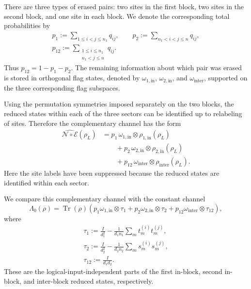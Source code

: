 \documentclass[10pt,twocolumn,superscriptaddress,aps,amsmath,amssymb,citeautoscript,floatfix,prx,longbibliography]{revtex4-2}
\theoremstyle{plain}
\theoremstyle{plain}
\theoremstyle{plain}
\theoremstyle{plain}
\theoremstyle{plain}
\theoremstyle{plain}
\begin{document}
There are three types of erased pairs: two sites in the first block, two sites in the second block, and one site in each block. We denote the corresponding total probabilities by
$$
\begin{gathered}
    p_1
    :=
    \sum_{1\le i<j\le n_1}
    q_{ij},
    \qquad
    p_2
    :=
    \sum_{n_1<i<j\le n}
    q_{ij},
    \\
    p_{12}
    :=
    \sum_{\substack{1\le i\le n_1\\ n_1<j\le n}}
    q_{ij}.
\end{gathered}
$$
Thus $p_{12}=1-p_1-p_2$. The remaining information about which pair was erased is stored in orthogonal flag states, denoted by $\omega_{1,\mathrm{in}}$, $\omega_{2,\mathrm{in}}$, and $\omega_{\mathrm{inter}}$, supported on the three corresponding flag subspaces.

Using the permutation symmetries imposed separately on the two blocks, the reduced states within each of the three sectors can be identified up to relabeling of sites. Therefore the complementary channel has the form
$$
\begin{aligned}
    \widehat{\mathcal N\circ\mathcal E}(\rho_L)
    &=
    p_1\,
    \omega_{1,\mathrm{in}}
    \otimes
    \rho_{1,\mathrm{in}}(\rho_L)
    \\
    &\qquad
    +
    p_2\,
    \omega_{2,\mathrm{in}}
    \otimes
    \rho_{2,\mathrm{in}}(\rho_L)
    \\
    &\qquad
    +
    p_{12}\,
    \omega_{\mathrm{inter}}
    \otimes
    \rho_{\mathrm{inter}}(\rho_L).
\end{aligned}
$$
Here the site labels have been suppressed because the reduced states are identified within each sector.

We compare this complementary channel with the constant channel
$$
    \Lambda_0(\rho)
    =
    \operatorname{Tr}(\rho)
    \left(
        p_1\omega_{1,\mathrm{in}}\otimes\tau_1
        +
        p_2\omega_{2,\mathrm{in}}\otimes\tau_2
        +
        p_{12}\omega_{\mathrm{inter}}\otimes\tau_{12}
    \right),
$$
where
$$
\begin{gathered}
    \tau_1
    :=
    \frac{I}{d_1^2}
    -
    \frac{1}{d_1n_1}
    \sum_m t_m^{(i)}t_m^{(j)},
    \\
    \tau_2
    :=
    \frac{I}{d_2^2}
    -
    \frac{1}{d_2n_2}
    \sum_m s_m^{(i)}s_m^{(j)},
    \\
    \tau_{12}
    :=
    \frac{I}{d_1d_2}.
\end{gathered}
$$
These are the logical-input-independent parts of the first in-block, second in-block, and inter-block reduced states, respectively.
\end{document}

